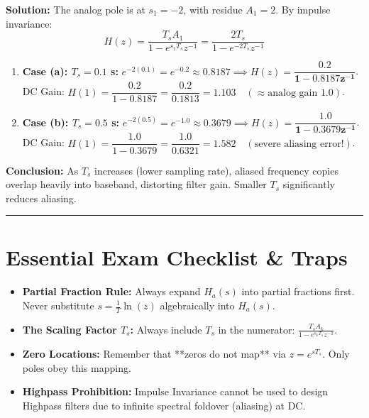 \documentclass[11pt,a4paper]{article}
\begin{document}
\vspace{1mm}
\noindent\textbf{Solution:}
The analog pole is at $s_1 = -2$, with residue $A_1 = 2$. By impulse invariance:
\begin{equation}
H(z) = \frac{T_s A_1}{1 - e^{s_1 T_s} z^{-1}} = \frac{2 T_s}{1 - e^{-2 T_s} z^{-1}}
\end{equation}
\begin{enumerate}
    \item \textbf{Case (a): $T_s = 0.1$ s:} $e^{-2(0.1)} = e^{-0.2} \approx 0.8187 \implies H(z) = \mathbf{\dfrac{0.2}{1 - 0.8187 z^{-1}}}$. \\
    DC Gain: $H(1) = \dfrac{0.2}{1 - 0.8187} = \dfrac{0.2}{0.1813} = \mathbf{1.103} \quad (\approx \text{analog gain } 1.0)$.
    \item \textbf{Case (b): $T_s = 0.5$ s:} $e^{-2(0.5)} = e^{-1.0} \approx 0.3679 \implies H(z) = \mathbf{\dfrac{1.0}{1 - 0.3679 z^{-1}}}$. \\
    DC Gain: $H(1) = \dfrac{1.0}{1 - 0.3679} = \dfrac{1.0}{0.6321} = \mathbf{1.582} \quad (\text{severe aliasing error!})$.
\end{enumerate}
\textbf{Conclusion:} As $T_s$ increases (lower sampling rate), aliased frequency copies overlap heavily into baseband, distorting filter gain. Smaller $T_s$ significantly reduces aliasing.

\noindent\rule{\textwidth}{0.5pt}

\section{Essential Exam Checklist \& Traps}
\begin{itemize}
    \item[$\square$] \textbf{Partial Fraction Rule:} Always expand $H_a(s)$ into partial fractions first. Never substitute $s = \frac{1}{T}\ln(z)$ algebraically into $H_a(s)$.
    \item[$\square$] \textbf{The Scaling Factor $T_s$:} Always include $T_s$ in the numerator: $\frac{T_s A_k}{1 - e^{s_k T_s} z^{-1}}$.
    \item[$\square$] \textbf{Zero Locations:} Remember that **zeros do not map** via $z = e^{s T_s}$. Only poles obey this mapping.
    \item[$\square$] \textbf{Highpass Prohibition:} Impulse Invariance cannot be used to design Highpass filters due to infinite spectral foldover (aliasing) at DC.
\end{itemize}
\end{document}
